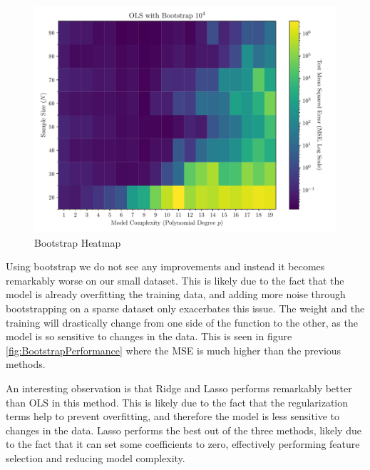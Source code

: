 \documentclass[twocolumn,aps]{revtex4}
\begin{document}
\begin{figure}[h]
    \centering
    \includegraphics[width=.95 \linewidth]{Figures/Bootstrap_Heatmap.pdf}
    \caption{Bootstrap Heatmap }
    \label{fig:BootstrapHeatmap}
\end{figure}

Using bootstrap we do not see any improvements and instead it becomes remarkably worse on our small dataset.
This is likely due to the fact that the model is already overfitting the training data, and adding more noise through bootstrapping on a sparse dataset only exacerbates this issue.
The weight and the training will drastically change from one side of the function to the other, as the model is so sensitive to changes in the data.
This is seen in figure \ref{fig:BootstrapPerformance} where the MSE is much higher than the previous methods.

An interesting observation is that Ridge and Lasso performs remarkably better than OLS in this method.
This is likely due to the fact that the regularization terms help to prevent overfitting, and therefore the model is less sensitive to changes in the data.
Lasso performs the best out of the three methods, likely due to the fact that it can set some coefficients to zero, effectively performing feature selection and reducing model complexity.
\end{document}
